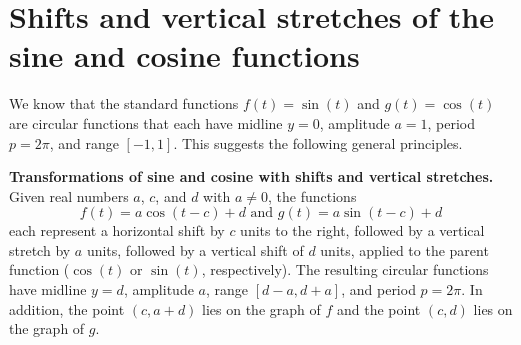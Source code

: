 \documentclass{ximera}
\begin{document}
%
%
%
\section{Shifts and vertical stretches of the sine and cosine functions}
We know that the standard functions \(f(t) = \sin(t)\) and \(g(t) = \cos(t)\) are circular functions that each have midline \(y = 0\), amplitude \(a = 1\), period \(p = 2\pi\), and range \([-1,1]\). This suggests the following general principles.%
\begin{callout}
\textbf{Transformations of sine and cosine with shifts and vertical stretches.}\\
Given real numbers \(a\), \(c\), and \(d\) with \(a \ne 0\), the functions%
\[
f(t) = a\cos(t-c)+d \text{ and } g(t) = a\sin(t-c) + d
\]
each represent a horizontal shift by \(c\) units to the right, followed by a vertical stretch by \(a\) units, followed by a vertical shift of \(d\) units, applied to the parent function (\(\cos(t)\) or \(\sin(t)\), respectively).  The resulting circular functions have midline \(y = d\), amplitude \(a\), range \([d-a,d+a]\), and period \(p = 2\pi\).  In addition, the point \((c,a+d)\) lies on the graph of \(f\) and the point \((c,d)\) lies on the graph of \(g\).%
\end{callout}
\end{document}
